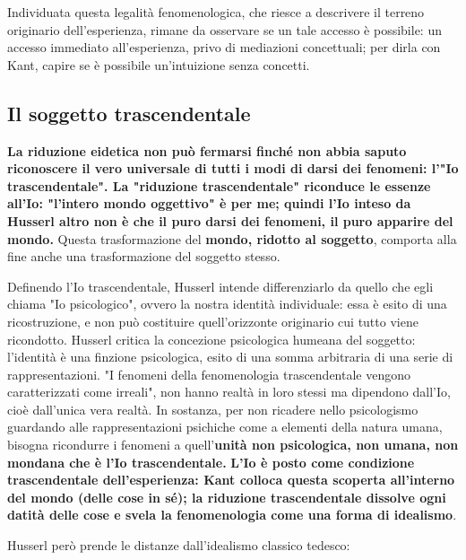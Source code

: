 Individuata questa legalità fenomenologica, che
riesce a descrivere il terreno originario dell'esperienza,
rimane da osservare se un tale accesso è possibile:
un accesso immediato all'esperienza, privo di mediazioni concettuali; per dirla con Kant, capire se è possibile un'intuizione
senza concetti.

\subsection{Il soggetto trascendentale}

\textbf{La riduzione eidetica non può fermarsi finché non abbia
saputo riconoscere il vero universale di tutti i modi di
darsi dei fenomeni: l'"Io trascendentale".
La "riduzione trascendentale" riconduce le essenze
all'Io: "l'intero mondo oggettivo" è per me; quindi l'Io inteso da Husserl altro non è che il puro darsi dei fenomeni, il puro apparire del mondo.}
Questa trasformazione del \textbf{mondo, ridotto al
soggetto}, comporta alla fine anche una
trasformazione del soggetto stesso.

Definendo l'Io trascendentale, Husserl intende
differenziarlo da quello che egli chiama
"Io psicologico", ovvero la nostra identità
individuale: essa è esito di una ricostruzione, e non
può costituire quell'orizzonte originario cui tutto
viene ricondotto. Husserl critica la concezione psicologica
humeana del soggetto: l'identità è una finzione
psicologica, esito di una somma arbitraria di una
serie di rappresentazioni.
"I fenomeni della fenomenologia trascendentale vengono
caratterizzati come irreali", non hanno realtà in
loro stessi ma dipendono dall'Io, cioè dall'unica
vera realtà.
In sostanza, per non ricadere nello psicologismo guardando alle rappresentazioni psichiche come a elementi della
natura umana, bisogna ricondurre i fenomeni a
quell'\textbf{unità non psicologica, non umana,
non mondana che è l'Io trascendentale.}
\textbf{L'Io  è posto come condizione trascendentale
dell'esperienza: Kant colloca questa scoperta
all'interno del mondo (delle cose in sé); la
riduzione trascendentale dissolve ogni datità
delle cose e svela la fenomenologia come una
forma di idealismo}.

Husserl però prende le distanze dall'idealismo classico tedesco:

